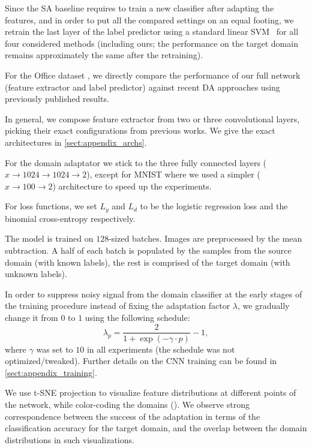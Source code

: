 Since the SA baseline requires to train a new classifier after adapting the features, and in order to put all the compared settings on an equal footing, we retrain the last layer of the label predictor using a standard linear SVM~\cite{liblinear} for all four considered methods (including ours; the performance on the target domain remains approximately the same after the retraining). 

For the {\sc Office} dataset \cite{Saenko10}, we directly compare the performance of our full network (feature extractor and label predictor) against recent DA approaches using previously published results.

\vspace{2mm} In general, we compose feature extractor from two or three convolutional layers, picking their exact configurations from previous works. We give the exact architectures in \ref{sect:appendix_archs}.

For the domain adaptator we stick to the three fully connected layers ($x\rightarrow1024\rightarrow1024\rightarrow2$), except for {\sc MNIST} where we used a simpler ($x\rightarrow100\rightarrow2$) architecture to speed up the experiments.

For loss functions, we set $ L_y $ and $ L_d $ to be the logistic regression loss and the binomial cross-entropy respectively.

\vspace{2mm}
The model is trained on $128$-sized batches. Images are preprocessed by the mean subtraction. A half of each batch is populated by the samples from the source domain (with known labels), the rest is comprised of the target domain (with unknown labels).

In order to suppress noisy signal from the domain classifier at the early stages of the training procedure instead of fixing the adaptation factor $ \lambda $, we gradually change it from $0$ to $1$ using the following schedule:
\begin{equation}
  \lambda_p = \frac{2}{1 + \exp(-\gamma \cdot p)} - 1,
\end{equation}
where $\gamma$ was set to $10$ in all experiments (the schedule was not optimized/tweaked). Further details on the CNN training can be found in \ref{sect:appendix_training}.

\vspace{2mm}
We use t-SNE \cite{Maaten13} projection to visualize feature distributions at different points of the network, while color-coding the domains (). We observe strong correspondence between the success of the adaptation in terms of the classification accuracy for the target domain, and the overlap between the domain distributions in such visualizations.
 
